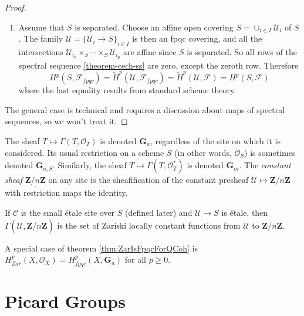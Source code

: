 \begin{proof}
\begin{enumerate}
\begin{description}
\end{description}
\item
Assume that $S$ is separated. Choose an affine open covering $S = \cup_{i \in 
I} \mathcal{U}_i$ of $S$. The family $\mathcal{U} = \{ \mathcal{U}_i \to S 
\}_{i \in I}$ is then an fpqc covering, and all the intersections 
$\mathcal{U}_{i_0} \times_S \cdots \times_S \mathcal{U}_{i_p}$ are affine since 
$S$ is separated. So all rows of the spectral sequence 
\ref{theorem-cech-ss} are zero, except the zeroth row. Therefore
$$
H^p(S, \mathcal{F}_{fpqc}) = \check H^p(\mathcal{U}, \mathcal{F}_{fpqc}) = \check 
H^p(\mathcal{U}, \mathcal{F}) = H^p(S, \mathcal{F})
$$
where the last equality results from standard scheme theory.
\end{enumerate}
The general case is technical and requires a discussion about maps of spectral 
sequences, so we won't treat it.
\end{proof}

\begin{definition}
The sheaf $T \mapsto \Gamma(T, \mathcal{O}_T)$ is denoted $\mathbf{G}_a$, 
regardless of the site on which it is considered. Its usual restriction on a 
scheme $S$ (in other words, $\mathcal{O}_S$) is sometimes denoted 
$\mathbf{G}_{a,S}$. Similarly, the sheaf $T \mapsto \Gamma(T, \mathcal{O}^*_T)$ 
is denoted $\mathbf{G}_m$.
The {\it constant sheaf} $\underline{\mathbf{Z}/n\mathbf{Z}}$ on any site is 
the sheafification of the constant presheaf $\mathcal{U} \mapsto 
\mathbf{Z}/n\mathbf{Z}$ with restriction maps the identity.
\end{definition}

\begin{remark}
If $\mathcal{C}$ is the small \'etale site over $S$ (defined later) and 
$\mathcal{U} \to S$ is \'etale, then $\Gamma(\mathcal{U}, 
\underline{\mathbf{Z}/n\mathbf{Z}})$ is the set of Zariski locally constant 
functions from $\mathcal{U}$ to $\mathbf{Z}/n\mathbf{Z}$.
\end{remark}

\begin{remark}
A special case of theorem \ref{thm:ZarIsFpqcForQCoh} is $H_{Zar}^p (X, 
\mathcal{O}_X) = H_{fpqc}^p(X, \mathbf{G}_a)$ for all $p \geq 0$.
\end{remark}

\section{Picard Groups}
\label{section-picard-groups}

